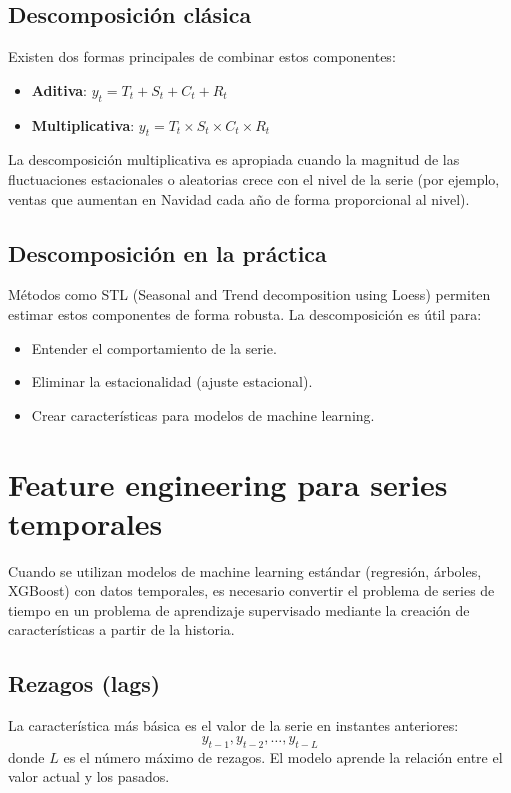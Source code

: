 \documentclass[12pt,a4paper,openany,oneside]{book}
\begin{document}
\subsection{Descomposición clásica}
Existen dos formas principales de combinar estos componentes:

\begin{itemize}
    \item \textbf{Aditiva}: \(y_t = T_t + S_t + C_t + R_t\)
    \item \textbf{Multiplicativa}: \(y_t = T_t \times S_t \times C_t \times R_t\)
\end{itemize}

La descomposición multiplicativa es apropiada cuando la magnitud de las fluctuaciones estacionales o aleatorias crece con el nivel de la serie (por ejemplo, ventas que aumentan en Navidad cada año de forma proporcional al nivel).

\subsection{Descomposición en la práctica}
Métodos como STL (Seasonal and Trend decomposition using Loess) permiten estimar estos componentes de forma robusta. La descomposición es útil para:
\begin{itemize}
    \item Entender el comportamiento de la serie.
    \item Eliminar la estacionalidad (ajuste estacional).
    \item Crear características para modelos de machine learning.
\end{itemize}

\section{Feature engineering para series temporales}

Cuando se utilizan modelos de machine learning estándar (regresión, árboles, XGBoost) con datos temporales, es necesario convertir el problema de series de tiempo en un problema de aprendizaje supervisado mediante la creación de características a partir de la historia.

\subsection{Rezagos (lags)}
La característica más básica es el valor de la serie en instantes anteriores:
\[
y_{t-1}, y_{t-2}, \dots, y_{t-L}
\]
donde \(L\) es el número máximo de rezagos. El modelo aprende la relación entre el valor actual y los pasados.
\end{document}
